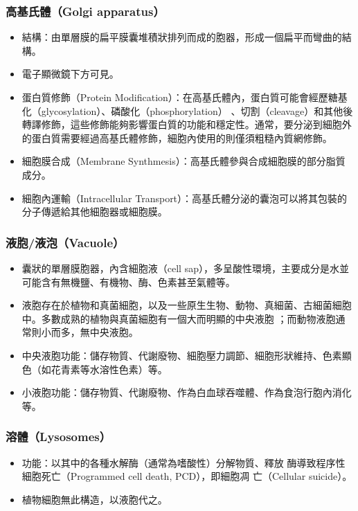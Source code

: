 \documentclass[a4paper,12pt]{report}
\begin{document}
\subsubsection{高基氏體（Golgi apparatus）}
\begin{itemize}
  \item 結構：由單層膜的扁平膜囊堆積狀排列而成的胞器，形成一個扁平而彎曲的結構。
  \item 電子顯微鏡下方可見。
  \item 蛋白質修飾（Protein Modification）：在高基氏體內，蛋白質可能會經歷糖基化（glycosylation）、磷酸化（phosphorylation） 、切割（cleavage）和其他後轉譯修飾，這些修飾能夠影響蛋白質的功能和穩定性。通常，要分泌到細胞外的蛋白質需要經過高基氏體修飾，細胞內使用的則僅須粗糙內質網修飾。
  \item 細胞膜合成（Membrane Synthmesis）：高基氏體參與合成細胞膜的部分脂質成分。
  \item 細胞內運輸（Intracellular Transport）：高基氏體分泌的囊泡可以將其包裝的分子傳遞給其他細胞器或細胞膜。
\end{itemize}
\subsubsection{液胞/液泡（Vacuole）}
\begin{itemize}
  \item 囊狀的單層膜胞器，內含細胞液（cell sap），多呈酸性環境，主要成分是水並可能含有無機鹽、有機物、酶、色素甚至氣體等。
  \item 液胞存在於植物和真菌細胞，以及一些原生生物、動物、真細菌、古細菌細胞中。多數成熟的植物與真菌細胞有一個大而明顯的中央液胞 ；而動物液胞通常則小而多，無中央液胞。
  \item 中央液胞功能：儲存物質、代謝廢物、細胞壓力調節、細胞形狀維持、色素顯色（如花青素等水溶性色素）等。
  \item 小液胞功能：儲存物質、代謝廢物、作為白血球吞噬體、作為食泡行胞內消化等。
\end{itemize}
\subsubsection{溶體（Lysosomes）}
\begin{itemize}
  \item 功能：以其中的各種水解酶（通常為嗜酸性）分解物質、釋放 酶導致程序性細胞死亡（Programmed cell death, PCD），即細胞凋 亡（Cellular suicide）。
  \item 植物細胞無此構造，以液胞代之。
\end{itemize}
\end{document}
